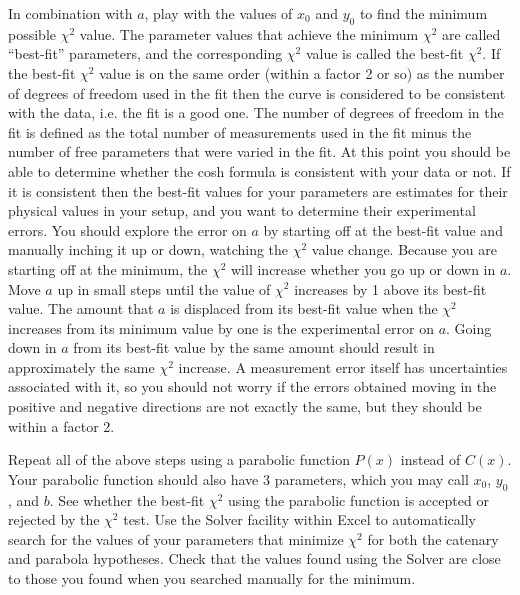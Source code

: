 \documentclass{revtex4}
\begin{document}
In combination with $a$, play with the values of $x_0$ and $y_0$ to find
the minimum possible $\chi^2$ value.  The parameter values that achieve the
minimum $\chi^2$ are called ``best-fit'' parameters, and the corresponding
$\chi^2$ value is called the best-fit $\chi^2$. If the best-fit $\chi^2$
value is on the same order (within a factor 2 or so) as the number of
degrees of freedom used in the fit then the curve is considered to be
consistent with the data, i.e. the fit is a good one.  The number of
degrees of freedom in the fit is defined as the total number of measurements
used in the fit minus the number of free parameters that were varied in the
fit.  At this point you should be able to determine whether the cosh formula
is consistent with your data or not. If it is consistent then the best-fit
values for your parameters are estimates for their physical values in your
setup, and you want to determine their experimental errors. You should
explore the error on $a$ by starting off at the best-fit value and manually
inching it up or down, watching the $\chi^2$ value change. Because you are
starting off at the minimum, the $\chi^2$ will increase whether you go up or
down in $a$. Move $a$ up in small steps until the value of $\chi^2$ increases
by 1 above its best-fit value. The amount that $a$ is displaced from its
best-fit value when the $\chi^2$ increases from its minimum value by one
is the experimental error on $a$. Going down in $a$ from its best-fit value
by the same amount should result in approximately the same $\chi^2$ increase.
A measurement error itself has uncertainties associated with it, so you should
not worry if the errors obtained moving in the positive and negative
directions are not exactly the same, but they should be within a factor 2.

Repeat all of the above steps using a parabolic function $P(x)$ instead of
$C(x)$.  Your parabolic function should also have 3 parameters, which you may
call $x_0$, $y_0$, and $b$. See whether the best-fit $\chi^2$ using the
parabolic function is accepted or rejected by the $\chi^2$ test.
Use the Solver facility within Excel to automatically search for the values
of your parameters that minimize $\chi^2$ for both the catenary and
parabola hypotheses.  Check that the values found using the Solver are
close to those you found when you searched manually for the minimum.
\end{document}
